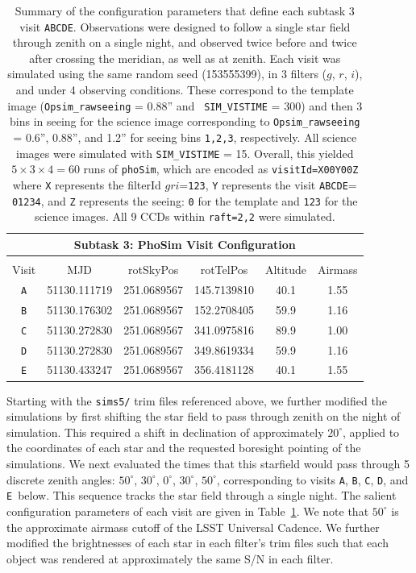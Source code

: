 \documentclass[DM,toc]{lsstdoc}
\def\A{{\tt A}}
\def\B{{\tt B}}
\def\C{{\tt C}}
\def\D{{\tt D}}
\def\E{{\tt E}}
\begin{document}
\begin{table}
\centering
\begin{tabular}{cccccc}
\hline
\multicolumn{6}{|c|}{Subtask 3: PhoSim Visit Configuration} \\ \hline \\
Visit & MJD           & rotSkyPos   & rotTelPos   & Altitude & Airmass \\
\hline
\A    & 51130.111719  & 251.0689567 & 145.7139810 & 40.1     & 1.55 \\
\B    & 51130.176302  & 251.0689567 & 152.2708405 & 59.9     & 1.16 \\
\C    & 51130.272830  & 251.0689567 & 341.0975816 & 89.9     & 1.00 \\
\D    & 51130.272830  & 251.0689567 & 349.8619334 & 59.9     & 1.16 \\
\E    & 51130.433247  & 251.0689567 & 356.4181128 & 40.1     & 1.55 \\
\end{tabular}
\caption[So I can have 2 paragraphs]{Summary of the configuration
  parameters that define each subtask 3 visit \A\B\C\D\E.
  Observations were designed to follow a single star field through
  zenith on a single night, and observed twice before and twice after
  crossing the meridian, as well as at zenith.  Each visit was
  simulated using the same random seed (153555399), in 3 filters ($g$,
  $r$, $i$), and under 4 observing conditions.  These correspond to
  the template image ({\tt Opsim\_rawseeing} = 0.88'' and {\tt
    SIM\_VISTIME} = 300) and then 3 bins in seeing for the science
  image corresponding to {\tt Opsim\_rawseeing} = 0.6'', 0.88'', and
  1.2'' for seeing bins {\tt 1,2,3}, respectively.  All science images
  were simulated with {\tt SIM\_VISTIME} = 15.  Overall, this yielded
  $5 \times 3 \times 4 = 60$ runs of {\tt phoSim}, which are encoded
  as {\tt visitId=X00Y00Z} where {\tt X} represents the filterId
  $gri$={\tt 123}, {\tt Y} represents the visit \A\B\C\D\E = {\tt
    01234}, and {\tt Z} represents the seeing: {\tt 0} for the
  template and {\tt 123} for the science images.  All 9 CCDs within
  {\tt raft=2,2} were simulated.  }
\label{tab:visits}
\end{table}

Starting with the {\tt sims5/} trim files referenced above, we further
modified the simulations by first shifting the star field to pass
through zenith on the night of simulation.  This required a shift in
declination of approximately $20^{\circ}$, applied to the coordinates
of each star and the requested boresight pointing of the simulations.
We next evaluated the times that this starfield would pass through 5
discrete zenith angles: $50^{\circ}$, $30^{\circ}$, $0^{\circ}$,
$30^{\circ}$, $50^{\circ}$, corresponding to visits \A, \B, \C, \D,
and \E\ below.  This sequence tracks the star field through a single
night.  The salient configuration parameters of each visit are given
in Table~\ref{tab:visits}.  We note that $50^{\circ}$ is the
approximate airmass cutoff of the LSST Universal Cadence.  We further
modified the brightnesses of each star in each filter's trim files
such that each object was rendered at approximately the same S/N in
each filter.
\end{document}
